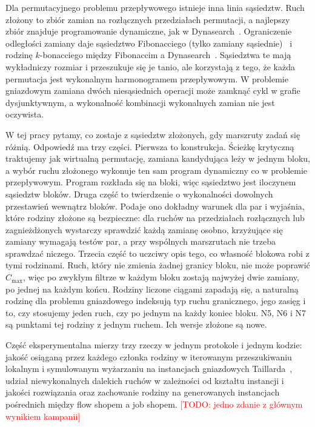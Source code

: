 \documentclass[10pt,twocolumn]{article}
\newcommand{\todo}[1]{\textcolor{red}{[TODO: #1]}}
\newcommand{\Cmax}{C_{\max}}
\begin{document}
Dla permutacyjnego problemu przepływowego istnieje inna linia sąsiedztw.
Ruch złożony to zbiór zamian na rozłącznych przedziałach permutacji,
a najlepszy zbiór znajduje programowanie dynamiczne, jak
w Dynasearch~\cite{congram2002}. Ograniczenie odległości zamiany daje
sąsiedztwo Fibonacciego (tylko zamiany sąsiednie)~\cite{fibonacci_own}
i rodzinę $k$-bonacciego między Fibonaccim
a Dynasearch~\cite{kbonacci_own}. Sąsiedztwa te mają wykładniczy rozmiar
i przeszukuje się je tanio, ale korzystają z tego, że każda permutacja
jest wykonalnym harmonogramem przepływowym. W problemie gniazdowym
zamiana dwóch niesąsiednich operacji może zamknąć cykl w grafie
dysjunktywnym, a wykonalność kombinacji wykonalnych zamian nie jest
oczywista.

W tej pracy pytamy, co zostaje z sąsiedztw złożonych, gdy marszruty zadań
się różnią. Odpowiedź ma trzy części. Pierwsza to konstrukcja. Ścieżkę
krytyczną traktujemy jak wirtualną permutację, zamiana kandydująca leży
w jednym bloku, a wybór ruchu złożonego wykonuje ten sam program
dynamiczny co w problemie przepływowym. Program rozkłada się na bloki,
więc sąsiedztwo jest iloczynem sąsiedztw bloków. Druga część to
twierdzenie o wykonalności dowolnych przestawień wewnątrz bloków. Podaje
ono dokładny warunek dla par i wyjaśnia, które rodziny złożone są
bezpieczne: dla ruchów na przedziałach rozłącznych lub zagnieżdżonych
wystarczy sprawdzić każdą zamianę osobno, krzyżujące się zamiany wymagają
testów par, a przy wspólnych marszrutach nie trzeba sprawdzać niczego.
Trzecia część to uczciwy opis tego, co własność blokowa robi z tymi
rodzinami. Ruch, który nie zmienia żadnej granicy bloku, nie może
poprawić $\Cmax$, więc po zwykłym filtrze w każdym bloku zostają najwyżej
dwie zamiany, po jednej na każdym końcu. Rodziny liczone ciągami zapadają
się, a naturalną rodzinę dla problemu gniazdowego indeksują typ ruchu
granicznego, jego zasięg i to, czy stosujemy jeden ruch, czy po jednym na
każdy koniec bloku. N5, N6 i N7 są punktami tej rodziny z jednym ruchem.
Ich wersje złożone są nowe.

Część eksperymentalna mierzy trzy rzeczy w jednym protokole i jednym
kodzie: jakość osiąganą przez każdego członka rodziny w iterowanym
przeszukiwaniu lokalnym i symulowanym wyżarzaniu na instancjach
gniazdowych Taillarda~\cite{taillard1993}, udział niewykonalnych dalekich
ruchów w zależności od kształtu instancji i jakości rozwiązania oraz
zachowanie rodziny na generowanych instancjach pośrednich między flow
shopem a job shopem. \todo{jedno zdanie z głównym wynikiem kampanii}
\end{document}
